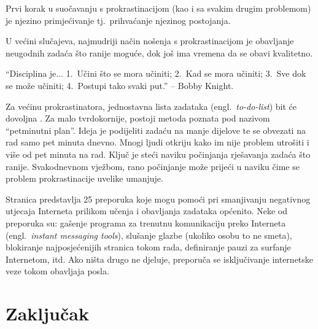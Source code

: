 \documentclass[11pt,twocolumn,english]{article}
\newcommand{\engl}[1]{(engl.~\emph{#1})}
\begin{document}
Prvi korak u suočavanju s prokrastinacijom (kao i sa svakim drugim problemom)
je njezino primjećivanje tj.~prihvaćanje njezinog postojanja. 

U većini slučajeva, najmudriji način nošenja s prokrastinacijom je obavljanje
neugodnih zadaća što ranije moguće, dok još ima vremena da se obavi kvalitetno.

``Disciplina je... 1.~Učini što se mora učiniti; 2.~Kad se mora učiniti; 3.~Sve
dok se može učiniti; 4.~Postupi tako svaki put.'' -- Bobby Knight.  

Za većinu prokrastinatora, jednostavna lista zadataka \engl{to-do-list}
bit će dovoljna \cite{TuckerPsySelfHelp}. Za malo tvrdokornije, postoji metoda
poznata pod nazivom ``petminutni plan''. Ideja je podijeliti zadaću na manje
dijelove te se obvezati na rad samo pet minuta dnevno. Mnogi ljudi otkriju kako
im nije problem utrošiti i više od pet minuta na rad. Ključ je steći naviku
počinjanja rješavanja zadaća što ranije. Svakodnevnom vježbom, rano počinjanje
može prijeći u naviku čime se problem prokrastinacije uvelike umanjuje.

Stranica \cite{ColDeg25ways} predstavlja 25 preporuka koje mogu
pomoći pri smanjivanju negativnog utjecaja Interneta prilikom učenja i obavljanja
zadataka općenito. Neke od preporuka su: gašenje programa za trenutnu
komunikaciju preko Interneta \engl{instant messaging tools}, slušanje glazbe
(ukoliko osobu to ne smeta), blokiranje najposjećenijih stranica tokom rada,
definiranje pauzi za surfanje Internetom, itd. Ako ništa drugo ne djeluje,
preporuča se isključivanje internetske veze tokom obavljaja posla.


\section{Zaključak}





\end{document}
